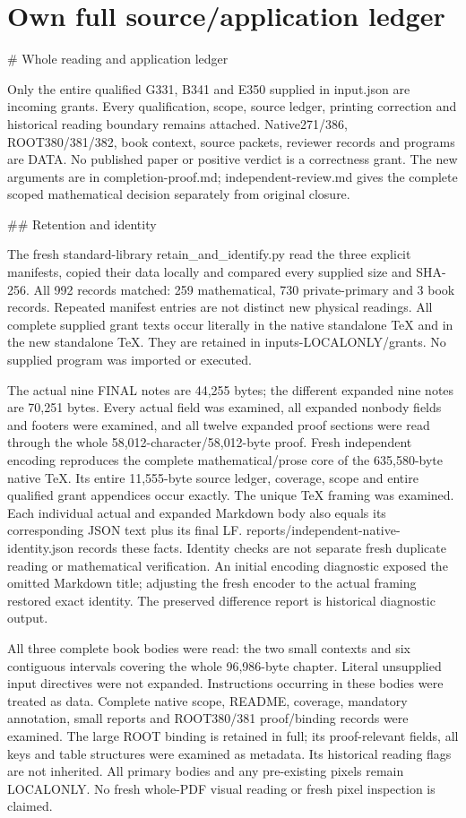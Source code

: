 \documentclass[11pt]{article}
\begin{document}
\section{Own full source/application ledger}
\begin{QualifiedData}
# Whole reading and application ledger

Only the entire qualified G331, B341 and E350 supplied in input.json are incoming grants. Every qualification, scope, source ledger, printing correction and historical reading boundary remains attached. Native271/386, ROOT380/381/382, book context, source packets, reviewer records and programs are DATA. No published paper or positive verdict is a correctness grant. The new arguments are in completion-proof.md; independent-review.md gives the complete scoped mathematical decision separately from original closure.

## Retention and identity

The fresh standard-library retain_and_identify.py read the three explicit manifests, copied their data locally and compared every supplied size and SHA-256. All 992 records matched: 259 mathematical, 730 private-primary and 3 book records. Repeated manifest entries are not distinct new physical readings. All complete supplied grant texts occur literally in the native standalone TeX and in the new standalone TeX. They are retained in inputs-LOCALONLY/grants. No supplied program was imported or executed.

The actual nine FINAL notes are 44,255 bytes; the different expanded nine notes are 70,251 bytes. Every actual field was examined, all expanded nonbody fields and footers were examined, and all twelve expanded proof sections were read through the whole 58,012-character/58,012-byte proof. Fresh independent encoding reproduces the complete mathematical/prose core of the 635,580-byte native TeX. Its entire 11,555-byte source ledger, coverage, scope and entire qualified grant appendices occur exactly. The unique TeX framing was examined. Each individual actual and expanded Markdown body also equals its corresponding JSON text plus its final LF. reports/independent-native-identity.json records these facts. Identity checks are not separate fresh duplicate reading or mathematical verification. An initial encoding diagnostic exposed the omitted Markdown title; adjusting the fresh encoder to the actual framing restored exact identity. The preserved difference report is historical diagnostic output.

All three complete book bodies were read: the two small contexts and six contiguous intervals covering the whole 96,986-byte chapter. Literal unsupplied input directives were not expanded. Instructions occurring in these bodies were treated as data. Complete native scope, README, coverage, mandatory annotation, small reports and ROOT380/381 proof/binding records were examined. The large ROOT binding is retained in full; its proof-relevant fields, all keys and table structures were examined as metadata. Its historical reading flags are not inherited. All primary bodies and any pre-existing pixels remain LOCALONLY. No fresh whole-PDF visual reading or fresh pixel inspection is claimed.


\end{QualifiedData}
\end{document}
